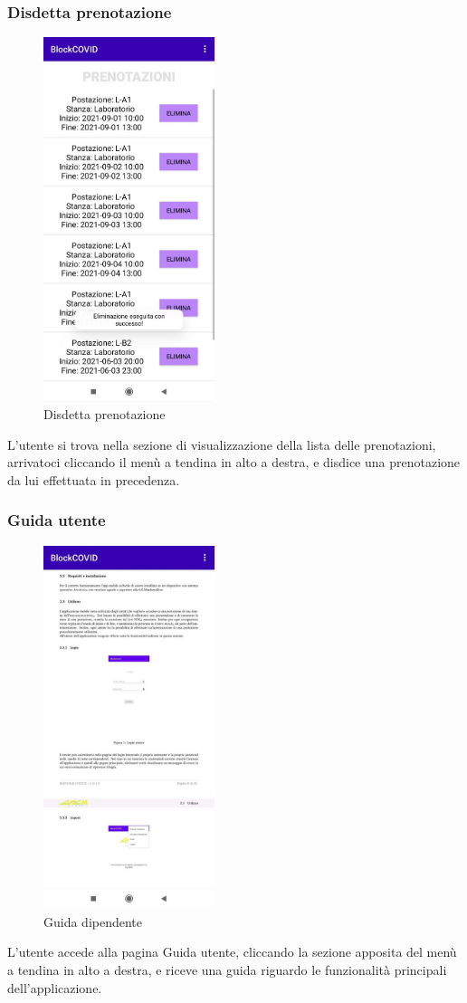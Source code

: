 	\subsubsection{Disdetta prenotazione}
	\begin{figure}[H]
		\centering
		\includegraphics[width=5cm]{res/images/MessaggioEliminazioneAvvenutaSuccesso.png}
		\caption{Disdetta prenotazione}
	\end{figure}
	L’utente si trova nella sezione di visualizzazione della lista delle prenotazioni, arrivatoci cliccando il menù a tendina in alto a destra, e disdice una prenotazione da lui effettuata in precedenza.
	\subsubsection{Guida utente}
	\begin{figure}[H]
		\centering
		\includegraphics[width=5cm]{res/images/guidaDipendente.png}
		\caption{Guida dipendente}
	\end{figure}
	L’utente accede alla pagina Guida utente, cliccando la sezione apposita del menù a tendina in alto a destra, e riceve una guida riguardo le funzionalità principali dell'applicazione.
